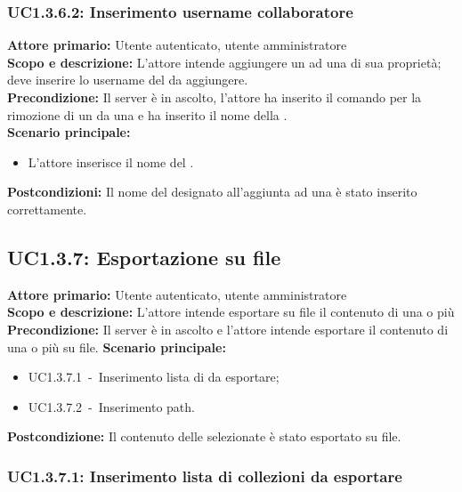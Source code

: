 \documentclass{scalatekids-article}
\begin{document}
\subsubsection{UC1.3.6.2: Inserimento username collaboratore}

\textbf{Attore primario:} Utente autenticato, utente amministratore\\
\textbf{Scopo e descrizione:} L'attore intende aggiungere un  ad una  di sua proprietà; deve inserire lo username del  da aggiungere.\\
\textbf{Precondizione:} Il server è in ascolto, l'attore ha inserito il comando per la rimozione di un  da una  e ha inserito il nome della .\\
\textbf{Scenario principale:}
\begin{itemize}
\item L'attore inserisce il nome del .
\end{itemize}
\textbf{Postcondizioni:} Il nome del  designato all'aggiunta ad una  è stato inserito correttamente.

\subsection{UC1.3.7: Esportazione su file}

\textbf{Attore primario:} Utente autenticato, utente amministratore\\
\textbf{Scopo e descrizione:} L'attore intende esportare su file il contenuto di una o più \\
\textbf{Precondizione:} Il server è in ascolto e l'attore intende esportare il contenuto di una o più  su file.
\textbf{Scenario principale:}
\begin{itemize}
\item UC1.3.7.1\ -\ Inserimento lista di  da esportare;
\item UC1.3.7.2\ -\ Inserimento path.
\end{itemize}
\textbf{Postcondizione:} Il contenuto delle  selezionate è stato esportato su file.

\subsubsection{UC1.3.7.1: Inserimento lista di collezioni da esportare}
\end{document}
